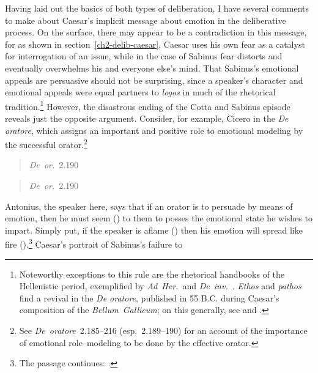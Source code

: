 \documentclass[12pt,letterpaper,oneside,final]{memoir}
\begin{document}
Having laid out the basics of both types of deliberation, I have several comments to make about Caesar's implicit message about emotion in the deliberative process. On the surface, there may appear to be a contradiction in this message, for as shown in section~\ref{ch2-delib-caesar}, Caesar uses his own fear as a catalyst for interrogation of an issue, while in the case of Sabinus fear distorts and eventually overwhelms his and everyone else's mind. That Sabinus's emotional appeals are persuasive should not be surprising, since a speaker's character and emotional appeals were equal partners to \emph{logos} in much of the rhetorical tradition.\footnote{Noteworthy exceptions to this rule are the rhetorical handbooks of the Hellenistic period, exemplified by \emph{Ad~Her.}~and \emph{De~inv.}~\parencite[77--93]{wisse1989}. \emph{Ethos} and \emph{pathos} find a revival in the \emph{De oratore}, published in 55 B.C. during Caesar's composition of the \emph{Bellum~Gallicum}; on this generally, see \parencite[pp.~222--249 and 250--300, on \emph{ethos} and \emph{pathos}, respectively]{wisse1989} and \parencite{wisse2002a}.} However, the disastrous ending of the Cotta and Sabinus episode reveals just the opposite argument. Consider, for example, Cicero in the \emph{De oratore}, which assigns an important and positive role to emotional modeling by the successful orator.\footnote{See \emph{De~oratore}~2.185--216 (esp.~2.189--190) for an account of the importance of emotional role--modeling to be done by the effective orator.} \blockquote[\emph{De~or.}~2.190]{} \blockquote[\emph{De~or.}~2.190]{} Antonius, the speaker here, says that if an orator is to persuade by means of emotion, then he must seem () to them to posses the emotional state he wishes to impart. Simply put, if the speaker is aflame () then his emotion will spread like fire ().\footnote{The passage continues: .} Caesar's portrait of Sabinus's failure to 
\end{document}
